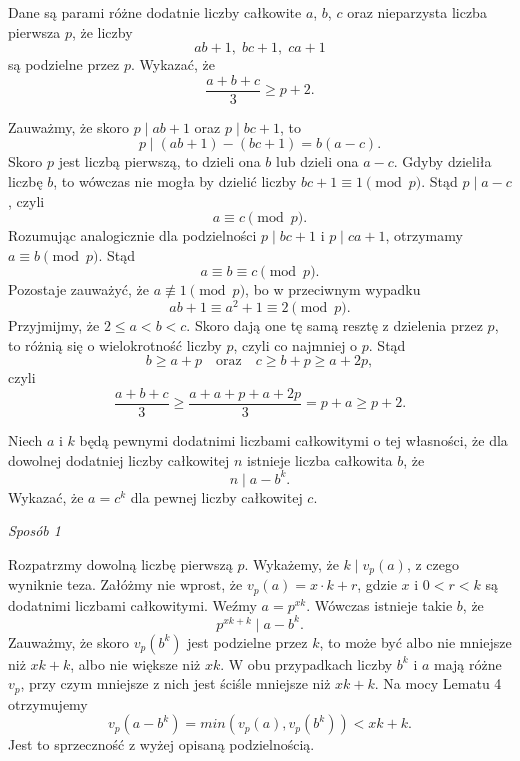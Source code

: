 \begin{problem}{5}
	Dane są parami różne dodatnie liczby całkowite $a$, $b$, $c$ oraz nieparzysta liczba pierwsza $p$, że liczby
	\[
		ab + 1, \; bc + 1, \; ca + 1
	\] 
	są podzielne przez $p$. Wykazać, że
	\[
		\frac{a + b + c}{3} \geqslant p + 2.
	\]
\end{problem}

\noindent
Zauważmy, że skoro $p \mid ab + 1$ oraz $p \mid bc + 1$, to
\[
	p \mid (ab + 1) - (bc + 1) = b(a - c).
\]
Skoro $p$ jest liczbą pierwszą, to dzieli ona $b$ lub dzieli ona $a - c$. Gdyby dzieliła liczbę $b$, to wówczas nie mogła by dzielić liczby $bc + 1 \equiv 1 \pmod{p}$. Stąd $p \mid a - c$, czyli 
\[
	a \equiv c \pmod{p}.
\] 
Rozumując analogicznie dla podzielności $p \mid bc + 1$ i $p \mid ca + 1$, otrzymamy $a \equiv b \pmod{p}$. Stąd
\[
	a \equiv b \equiv c \pmod{p}.
\]
Pozostaje zauważyć, że $a \not\equiv 1 \pmod{p}$, bo w przeciwnym wypadku 
\[
	ab + 1 \equiv a^2 + 1 \equiv 2 \pmod{p}.
\]
Przyjmijmy, że $2 \leqslant a < b < c$. Skoro dają one tę samą resztę z dzielenia przez $p$, to różnią się o wielokrotność liczby $p$, czyli co najmniej o $p$. Stąd
\[
	b \geqslant a + p \quad \text{oraz} \quad c \geqslant b + p \geqslant a + 2p,
\]
czyli
\[
	\frac{a + b + c}{3} \geqslant \frac{a + a + p + a + 2p}{3} = p + a \geqslant p + 2.
\]

\begin{problem}{6}
	Niech $a$ i $k$ będą pewnymi dodatnimi liczbami całkowitymi o tej własności, że dla dowolnej dodatniej liczby całkowitej $n$ istnieje liczba całkowita $b$, że
	\[
		n \mid a - b^k.
	\]
	Wykazać, że $a = c^k$ dla pewnej liczby całkowitej $c$.
\end{problem}

\noindent
\textit{Sposób 1}

\vspace{10px}

\noindent
Rozpatrzmy dowolną liczbę pierwszą $p$. Wykażemy, że $k \mid v_p(a)$, z czego wyniknie teza. Załóżmy nie wprost, że $v_p(a) = x \cdot k + r$, gdzie $x$ i $0 < r < k$ są dodatnimi liczbami całkowitymi. Weźmy $a = p^{xk}$. Wówczas istnieje takie $b$, że
\[
	p^{xk + k} \mid a - b^k.
\]
Zauważmy, że skoro $v_p(b^k)$ jest podzielne przez $k$, to może być albo nie mniejsze niż $xk + k$, albo nie większe niż $xk$. W obu przypadkach liczby $b^k$ i $a$ mają różne $v_p$, przy czym mniejsze z nich jest ściśle mniejsze niż $xk + k$. Na mocy Lematu 4 otrzymujemy 
\[
	v_p(a - b^k) = min(v_p(a), v_p(b^k)) < xk + k.
\]
Jest to sprzeczność z wyżej opisaną podzielnością.

